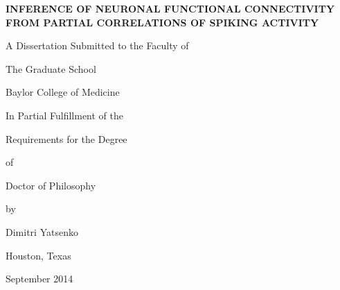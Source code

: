 \documentclass[12pt,letterpaper,titlepage,twoside,openright]{report}
\begin{document}
\begin{titlepage}
\begin{center}

\vspace*{2cm}
\textbf{\uppercase{\large Inference of neuronal functional connectivity from partial correlations of spiking activity}}

\vspace{1.5cm}
A Dissertation Submitted to the Faculty of

\medskip
The Graduate School 

Baylor College of Medicine

\vspace{1.5cm}
In Partial Fulfillment of the 

Requirements for the Degree

of 

Doctor of Philosophy

by 

\bigskip
{\large Dimitri Yatsenko}

\vfill
Houston, Texas

September 2014

\end{center}
\end{titlepage}


\end{document}
